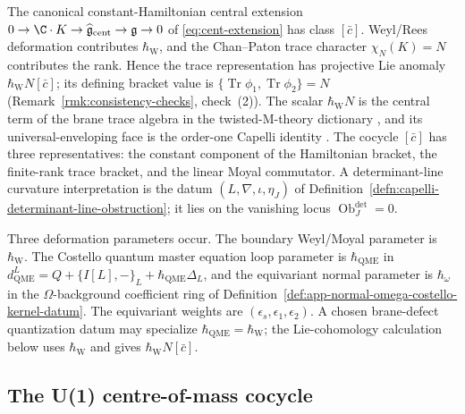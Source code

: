 \documentclass[11pt]{memoir}
\begin{document}
The canonical constant-Hamiltonian central extension
$0\to\C\cdot K\to\widehat{\mathfrak g}_{\mathrm{cent}}\to\mathfrak g\to0$
of \eqref{eq:cent-extension} has class \([\bar c]\).  Weyl/Rees
deformation contributes \(\hbar_{\mathrm W}\), and the Chan--Paton
trace character \(\chi_N(K)=N\) contributes the rank.  Hence the trace
representation has projective Lie anomaly
\(\hbar_{\mathrm W}N[\bar c]\); its defining bracket value is
$\{\operatorname{Tr}\phi_1,\operatorname{Tr}\phi_2\}=N$
(Remark~\ref{rmk:consistency-checks}, check~(2)).  The scalar
\(\hbar_{\mathrm{W}}N\) is the central term of the brane trace algebra
in the twisted-M-theory dictionary
\cite{costello-twistedM}\cite{costello-m2-koszul}\cite{gaiotto-oh-omega},
and its universal-enveloping face is the order-one Capelli identity
\cite{capelli}\cite{howe-capelli}.  The cocycle \([\bar c]\) has three
representatives: the constant component of the Hamiltonian bracket,
the finite-rank trace bracket, and the linear Moyal commutator.  A
determinant-line curvature interpretation is the datum
\((L,\nabla,\iota,\eta_J)\) of
Definition~\ref{defn:capelli-determinant-line-obstruction}; it lies on
the vanishing locus \(\operatorname{Ob}^{\det}_J=0\).

Three deformation parameters occur.  The boundary Weyl/Moyal parameter
is \(\hbar_{\mathrm{W}}\).  The Costello quantum master equation loop
parameter is \(\hbar_{\mathrm{QME}}\) in
\(d_{\mathrm{QME}}^L=Q+\{I[L],-\}_L+\hbar_{\mathrm{QME}}\Delta_L\),
and the equivariant normal parameter is \(\hbar_\omega\) in the
\(\Omega\)-background coefficient ring of
Definition~\ref{def:app-normal-omega-costello-kernel-datum}.  The
equivariant weights are
\((\epsilon_s,\epsilon_1,\epsilon_2)\).  A chosen brane-defect
quantization datum may specialize
\(\hbar_{\mathrm{QME}}=\hbar_{\mathrm{W}}\); the Lie-cohomology
calculation below uses \(\hbar_{\mathrm{W}}\) and gives
\(\hbar_{\mathrm{W}}N[\bar c]\).

\subsection{The U(1) centre-of-mass cocycle}\label{subsec:scalar-anomaly}
\end{document}
